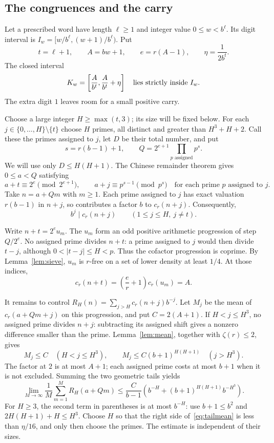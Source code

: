 \documentclass[11pt]{article}
\begin{document}
\subsection*{The congruences and the carry}

Let a prescribed word have length $\ell\ge1$ and integer value
$0\le w<b^\ell$. Its digit interval is
$I_w=[w/b^\ell,(w+1)/b^\ell)$. Put
\[
t=\ell+1,\qquad A=bw+1,\qquad e=r(A-1),\qquad
\eta=\frac{1}{2b^t}.
\]
The closed interval
\begin{equation}\label{eq:guard}
K_w=\left[\frac A{b^t},\frac A{b^t}+\eta\right]
\quad\hbox{lies strictly inside }I_w.
\end{equation}
The extra digit $1$ leaves room for a small positive carry.

Choose a large integer $H\ge\max(t,3)$; its size will be fixed below.
For each $j\in\{0,\ldots,H\}\setminus\{t\}$ choose $H$ primes, all
distinct and greater than $H^3+H+2$. Call these the primes assigned to
$j$, let $D$ be their total number, and put
\[
s=r(b-1)+1,\qquad Q=2^{e+1}\prod_{p\text{ assigned}}p^s.
\]
We will use only $D\le H(H+1)$. The Chinese remainder theorem gives
$0\le a<Q$ satisfying
\[
a+t\equiv2^e\pmod{2^{e+1}},\qquad
a+j\equiv p^{s-1}\pmod{p^s}
\quad\text{for each prime $p$ assigned to $j$}.
\]
Take $n=a+Qm$ with $m\ge1$. Each prime assigned to $j$ has exact
valuation $r(b-1)$ in $n+j$, so contributes a factor $b$ to $c_r(n+j)$.
Consequently,
\begin{equation}\label{eq:integral}
b^j\mid c_r(n+j)\qquad(1\le j\le H,\ j\ne t).
\end{equation}

Write $n+t=2^e u_m$. The $u_m$ form an odd positive arithmetic
progression of step $Q/2^e$. No assigned prime divides $n+t$: a prime
assigned to $j$ would then divide $t-j$, although $0<|t-j|\le H<p$.
Thus the cofactor progression is coprime. By Lemma~\ref{lem:sieve},
$u_m$ is $r$-free on a set of lower density at least $1/4$.
At those indices,
\begin{equation}\label{eq:target}
c_r(n+t)=\left(\frac e r+1\right)c_r(u_m)=A.
\end{equation}

It remains to control $R_H(n)=\sum_{j>H}c_r(n+j)b^{-j}$.
Let $M_j$ be the mean of $c_r(a+Qm+j)$ on this progression, and put
$C=2(A+1)$. If $H<j\le H^3$, no assigned prime divides $n+j$:
subtracting its assigned shift gives a nonzero difference smaller than
the prime. Lemma~\ref{lem:mean}, together with $\zeta(r)\le2$, gives
\[
M_j\le C\quad(H<j\le H^3),\qquad
M_j\le C(b+1)^{H(H+1)}\quad(j>H^3).
\]
The factor at $2$ is at most $A+1$; each assigned prime costs at most
$b+1$ when it is not excluded. Summing the two geometric tails yields
\begin{equation}\label{eq:tailmean}
\lim_{M\to\infty}\frac1M\sum_{m=1}^{M}R_H(a+Qm)
\le \frac C{b-1}\left(b^{-H}+(b+1)^{H(H+1)}b^{-H^3}\right).
\end{equation}
For $H\ge3$, the second term in parentheses is at most $b^{-H}$:
use $b+1\le b^2$ and $2H(H+1)+H\le H^3$.
Choose $H$ so that the right side of~\eqref{eq:tailmean} is less than
$\eta/16$, and only then choose the primes. The estimate is independent
of their sizes.
\end{document}
